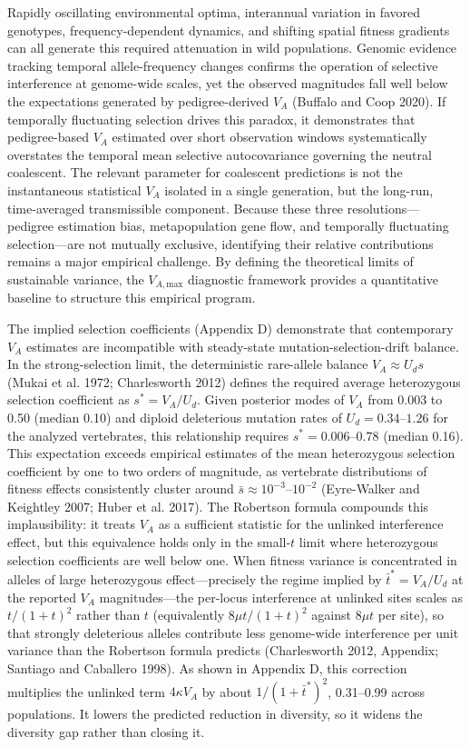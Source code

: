 \documentclass[12pt]{article}
\begin{document}
Rapidly oscillating environmental optima, interannual variation in favored genotypes, frequency-dependent dynamics, and shifting spatial fitness gradients can all generate this required attenuation in wild populations. Genomic evidence tracking temporal allele-frequency changes confirms the operation of selective interference at genome-wide scales, yet the observed magnitudes fall well below the expectations generated by pedigree-derived $V_A$ (Buffalo and Coop 2020). If temporally fluctuating selection drives this paradox, it demonstrates that pedigree-based $V_A$ estimated over short observation windows systematically overstates the temporal mean selective autocovariance governing the neutral coalescent. The relevant parameter for coalescent predictions is not the instantaneous statistical $V_A$ isolated in a single generation, but the long-run, time-averaged transmissible component. Because these three resolutions—pedigree estimation bias, metapopulation gene flow, and temporally fluctuating selection—are not mutually exclusive, identifying their relative contributions remains a major empirical challenge. By defining the theoretical limits of sustainable variance, the $V_{A,\text{max}}$ diagnostic framework provides a quantitative baseline to structure this empirical program.

The implied selection coefficients (Appendix D) demonstrate that contemporary $V_A$ estimates are incompatible with steady-state mutation-selection-drift balance. In the strong-selection limit, the deterministic rare-allele balance $V_A \approx U_d s$ (Mukai et al. 1972; Charlesworth 2012) defines the required average heterozygous selection coefficient as $s^* = V_A/U_d$. Given posterior modes of $V_A$ from 0.003 to 0.50 (median 0.10) and diploid deleterious mutation rates of $U_d = 0.34$--$1.26$ for the analyzed vertebrates, this relationship requires $s^* = 0.006$--$0.78$ (median 0.16). This expectation exceeds empirical estimates of the mean heterozygous selection coefficient by one to two orders of magnitude, as vertebrate distributions of fitness effects consistently cluster around $\bar{s} \approx 10^{-3}–10^{-2}$ (Eyre-Walker and Keightley 2007; Huber et al. 2017). The Robertson formula compounds this implausibility: it treats $V_A$ as a sufficient statistic for the unlinked interference effect, but this equivalence holds only in the small-$t$ limit where heterozygous selection coefficients are well below one. When fitness variance is concentrated in alleles of large heterozygous effect—precisely the regime implied by $\bar{t}^* = V_A/U_d$ at the reported $V_A$ magnitudes—the per-locus interference at unlinked sites scales as $t/(1+t)^2$ rather than $t$ (equivalently $8\mu t/(1+t)^2$ against $8\mu t$ per site), so that strongly deleterious alleles contribute less genome-wide interference per unit variance than the Robertson formula predicts (Charlesworth 2012, Appendix; Santiago and Caballero 1998). As shown in Appendix D, this correction multiplies the unlinked term $4\kappa V_A$ by about $1/(1+\bar{t}^*)^2$, 0.31--0.99 across populations. It lowers the predicted reduction in diversity, so it widens the diversity gap rather than closing it.
\end{document}
